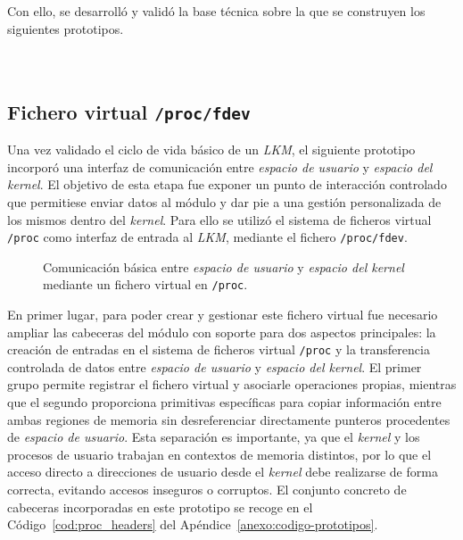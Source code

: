 Con ello, se desarrolló y validó la base técnica sobre la que se construyen los siguientes prototipos.\\\\

\

\subsection{Fichero virtual \texttt{/proc/fdev}}

Una vez validado el ciclo de vida básico de un \textit{LKM}, el siguiente prototipo incorporó una interfaz de comunicación entre \textit{espacio de usuario} y \textit{espacio del kernel}.
El objetivo de esta etapa fue exponer un punto de interacción controlado que permitiese enviar datos al módulo y dar pie a una gestión personalizada de los mismos dentro del \textit{kernel}.
Para ello se utilizó el sistema de ficheros virtual \texttt{/proc} como interfaz de entrada al \textit{LKM}, mediante el fichero \texttt{/proc/fdev}.\\

\begin{figure}[h!]
  \centering
  \scalebox{1}{}
  \caption{Comunicación básica entre \textit{espacio de usuario} y \textit{espacio del kernel} mediante un fichero virtual en \texttt{/proc}.}
  \label{fig:proc_fdev_scheme}
\end{figure}

En primer lugar, para poder crear y gestionar este fichero virtual fue necesario ampliar las cabeceras del módulo con soporte para dos aspectos principales: la creación de entradas en el sistema de ficheros virtual \texttt{/proc} y la transferencia controlada de datos entre \textit{espacio de usuario} y \textit{espacio del kernel}.
El primer grupo permite registrar el fichero virtual y asociarle operaciones propias, mientras que el segundo proporciona primitivas específicas para copiar información entre ambas regiones de memoria sin desreferenciar directamente punteros procedentes de \textit{espacio de usuario}.
Esta separación es importante, ya que el \textit{kernel} y los procesos de usuario trabajan en contextos de memoria distintos, por lo que el acceso directo a direcciones de usuario desde el \textit{kernel} debe realizarse de forma correcta, evitando accesos inseguros o corruptos.
El conjunto concreto de cabeceras incorporadas en este prototipo se recoge en el Código~\ref{cod:proc_headers} del Apéndice~\ref{anexo:codigo-prototipos}.\\

